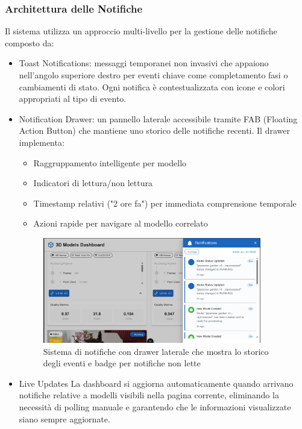 \subsubsection{Architettura delle Notifiche}

Il sistema utilizza un approccio multi-livello per la gestione delle notifiche composto da:

\begin{itemize}
\item Toast Notifications: messaggi temporanei non invasivi che appaiono nell'angolo superiore destro per eventi chiave come completamento fasi o cambiamenti di stato. Ogni notifica è contestualizzata con icone e colori appropriati al tipo di evento.

\item  Notification Drawer:
un pannello laterale accessibile tramite FAB (Floating Action Button) che mantiene uno storico delle notifiche recenti. Il drawer implementa:
\begin{itemize}
	\item Raggruppamento intelligente per modello
	\item Indicatori di lettura/non lettura
	\item Timestamp relativi ("2 ore fa") per immediata comprensione temporale
	\item Azioni rapide per navigare al modello correlato
\end{itemize}

\begin{figure}[htbp]
	\centering
	\includegraphics[width=0.9\textwidth]{images/frontend_notifications.jpg}
	\caption{Sistema di notifiche con drawer laterale che mostra lo storico degli eventi e badge per notifiche non lette}
	\label{fig:notification_drawer}
\end{figure}

\item Live Updates
La dashboard si aggiorna automaticamente quando arrivano notifiche relative a modelli visibili nella pagina corrente, eliminando la necessità di polling manuale e garantendo che le informazioni visualizzate siano sempre aggiornate.
\end{itemize}
